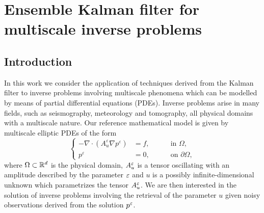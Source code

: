 \chapter{Ensemble Kalman filter for multiscale inverse problems}

\section{Introduction}

In this work we consider the application of techniques derived from the Kalman filter to inverse problems involving multiscale phenomena which can be modelled by means of partial differential equations (PDEs). Inverse problems arise in many fields, such as seismography, meteorology and tomography, all physical domains with a multiscale nature. Our reference mathematical model is given by multiscale elliptic PDEs of the form
\begin{equation}
\left\{
\begin{alignedat}{2}
- \nabla \cdot ( A^{\varepsilon}_u \nabla p^{\varepsilon} ) &= f, \quad && \text{ in } \Omega, \\
p^{\varepsilon} &= 0, \quad && \text{ on } \partial \Omega,
\end{alignedat}
\right.
\end{equation}
where $\Omega \subset \mathbb{R}^d$ is the physical domain, $A_u^\varepsilon$ is a tensor oscillating with an amplitude described by the parameter $\varepsilon$ and $u$ is a possibly infinite-dimensional unknown which parametrizes the tensor $A^\varepsilon_u$. We are then interested in the solution of inverse problems involving the retrieval of the parameter $u$ given noisy observations derived from the solution $p^\varepsilon$.

